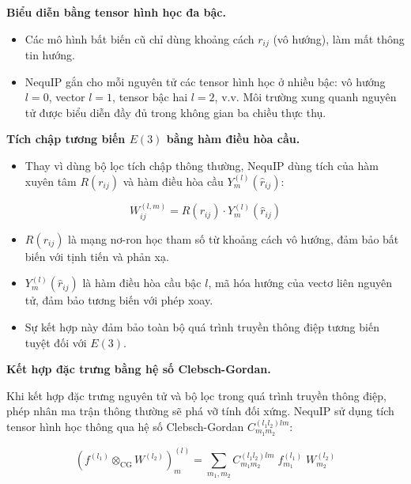 \vspace{0.5em}
\textbf{Biểu diễn bằng tensor hình học đa bậc.}

\begin{itemize}
    \item Các mô hình bất biến cũ chỉ dùng khoảng cách $r_{ij}$ (vô hướng), làm mất thông tin hướng.
    \item NequIP gắn cho mỗi nguyên tử các tensor hình học ở nhiều bậc: vô hướng $l=0$, vector $l=1$, tensor bậc hai $l=2$, v.v. Môi trường xung quanh nguyên tử được biểu diễn đầy đủ trong không gian ba chiều thực thụ.
\end{itemize}

\vspace{0.5em}
\textbf{Tích chập tương biến $E(3)$ bằng hàm điều hòa cầu.}

\begin{itemize}
    \item Thay vì dùng bộ lọc tích chập thông thường, NequIP dùng tích của hàm xuyên tâm $R(r_{ij})$ và hàm điều hòa cầu $Y_m^{(l)}(\hat{r}_{ij})$:
\end{itemize}

\begin{equation}
    W_{ij}^{(l,m)} = R\!\left(r_{ij}\right) \cdot Y_m^{(l)}\!\left(\hat{r}_{ij}\right)
    \label{eq:nequip-filter}
\end{equation}

\begin{itemize}
    \item $R(r_{ij})$ là mạng nơ-ron học tham số từ khoảng cách vô hướng, đảm bảo bất biến với tịnh tiến và phản xạ.
    \item $Y_m^{(l)}(\hat{r}_{ij})$ là hàm điều hòa cầu bậc $l$, mã hóa hướng của vectơ liên nguyên tử, đảm bảo tương biến với phép xoay.
    \item Sự kết hợp này đảm bảo toàn bộ quá trình truyền thông điệp tương biến tuyệt đối với $E(3)$.
\end{itemize}

\vspace{0.5em}
\textbf{Kết hợp đặc trưng bằng hệ số Clebsch-Gordan.}

Khi kết hợp đặc trưng nguyên tử và bộ lọc trong quá trình truyền thông điệp, phép nhân ma trận thông thường sẽ phá vỡ tính đối xứng. NequIP sử dụng tích tensor hình học thông qua hệ số Clebsch-Gordan $C_{m_1 m_2}^{(l_1 l_2) lm}$:

\begin{equation}
    \left(f^{(l_1)} \otimes_{\text{CG}} W^{(l_2)}\right)_m^{(l)}
    = \sum_{m_1, m_2} C_{m_1 m_2}^{(l_1 l_2) lm}\; f_{m_1}^{(l_1)}\; W_{m_2}^{(l_2)}
    \label{eq:clebsch-gordan}
\end{equation}

